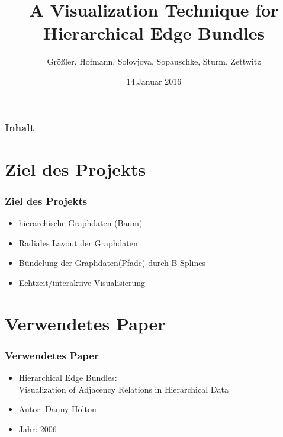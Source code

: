 \documentclass[11pt]{beamer}
\author{Größler, Hofmann, Solovjova, Sopauschke, Sturm, Zettwitz}
\title{A Visualization Technique for \\  Hierarchical Edge Bundles}
\date{14.Januar 2016}
\begin{document}
\begin{frame}
\titlepage
\end{frame}

\begin{frame}
\frametitle{Inhalt} 
\tableofcontents
\end{frame}


\section{Ziel des Projekts}
\begin{frame}
\frametitle{Ziel des Projekts}
\begin{itemize} 
\item hierarchische Graphdaten (Baum)
\item Radiales Layout der Graphdaten
\item Bündelung der Graphdaten(Pfade) durch B-Splines
\item Echtzeit/interaktive Visualisierung
\end{itemize}
\end{frame}

\section{Verwendetes Paper}
\begin{frame}[allowframebreaks]
\frametitle{Verwendetes Paper}
\begin{itemize} 
\item Hierarchical Edge Bundles: \\
Visualization of Adjacency Relations in Hierarchical Data
\item Autor: Danny Holton
\item Jahr: 2006
\end{itemize}
\end{frame}
\end{document}
